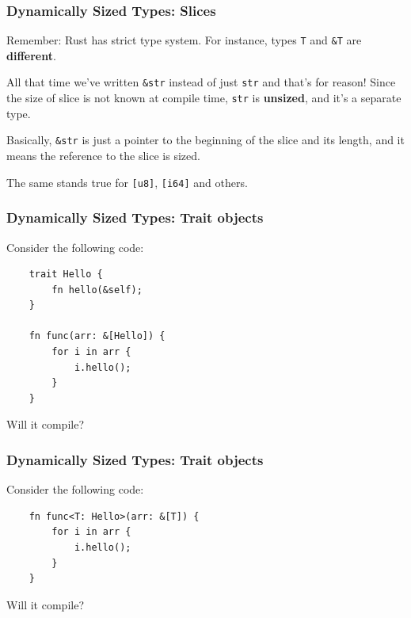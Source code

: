\documentclass[aspectratio=1610,t]{beamer}
\begin{document}

\begin{frame}[fragile]
\frametitle{Dynamically Sized Types: Slices}
Remember: Rust has strict type system. For instance, types \texttt{T} and \texttt{\&T} are \textbf{different}.

All that time we've written \texttt{\&str} instead of just \texttt{str} and that's for reason! Since the size of slice is not known at compile time, \texttt{str} is \textbf{unsized}, and it's a separate type.

Basically, \texttt{\&str} is just a pointer to the beginning of the slice and its length, and it means the reference to the slice is sized.

The same stands true for \texttt{[u8]}, \texttt{[i64]} and others.
\end{frame}


\begin{frame}[fragile]
\frametitle{Dynamically Sized Types: Trait objects}
Consider the following code:

\begin{verbatim}
    trait Hello {
        fn hello(&self);
    }

    fn func(arr: &[Hello]) {
        for i in arr {
            i.hello();
        }
    }
\end{verbatim}

Will it compile?

\end{frame}


\begin{frame}[fragile]
\frametitle{Dynamically Sized Types: Trait objects}
Consider the following code:

\begin{verbatim}
    fn func<T: Hello>(arr: &[T]) {
        for i in arr {
            i.hello();
        }
    }
\end{verbatim}

Will it compile?


\end{frame}
\end{document}
